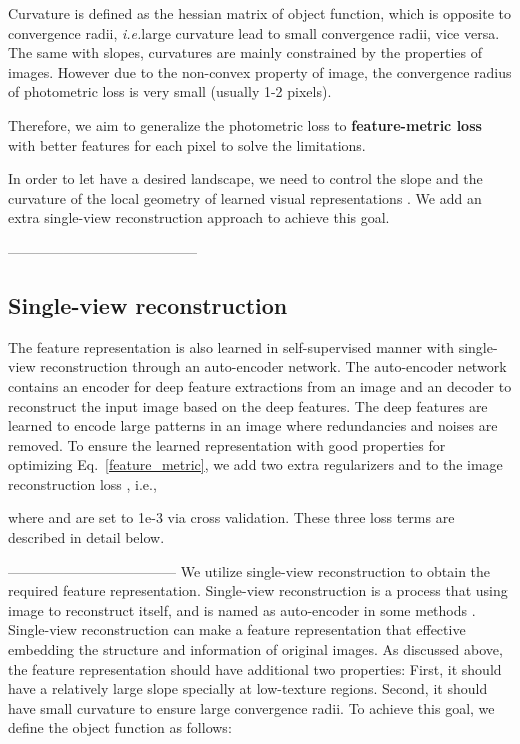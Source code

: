 \documentclass[runningheads]{llncs}
\def\ie{\emph{i.e.}}
\begin{document}
    
Curvature is defined as the hessian matrix of object function, which is opposite to convergence radii, \ie large curvature lead to small convergence radii, vice versa.
The same with slopes, curvatures are mainly constrained by the properties of images.
However due to the non-convex property of image, the convergence radius of photometric loss is very small (usually 1-2 pixels).

Therefore, we aim to generalize the photometric loss to \textbf{feature-metric loss} with better features for each pixel  to solve the limitations. 


In order to let  have a desired landscape, we need to control the slope and the curvature of the local geometry of learned visual representations .
We add an extra single-view reconstruction approach to achieve this goal.

-----------------------------------------
\fi




















\subsection{Single-view reconstruction}
The feature representation  is also learned in self-supervised manner with single-view reconstruction through an auto-encoder network. The auto-encoder network contains an encoder for deep feature extractions from an image and an decoder to reconstruct the input image based on the deep features. The deep features are learned to encode large patterns in an image where redundancies and noises are removed. To ensure the learned representation with good properties for optimizing Eq.~\ref{feature_metric}, we add two extra regularizers  and  to the image reconstruction loss , i.e.,

 where  and  are set to 1e-3 via cross validation. These three loss terms are described in detail below.

\iffalse
------------------------------------
We utilize single-view reconstruction to obtain the required feature representation.
Single-view reconstruction is a process that using image to reconstruct itself, and is named as auto-encoder in some methods \cite{stacked,denoise,afl,avb}. Single-view reconstruction can make a feature representation that effective embedding the structure and information of original images. As discussed above, the feature representation should have additional two properties: First, it should have a relatively large slope specially at low-texture regions. Second, it should have small curvature to ensure large convergence radii. 
To achieve this goal, we define the object function as follows:
\end{document}
